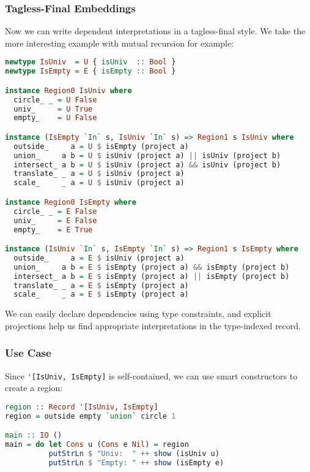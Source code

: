 \hypertarget{tagless-final-embeddings}{%
\subsubsection{Tagless-Final Embeddings}\label{tagless-final-embeddings}}

Now we can write dependent interpretations in a tagless-final style. We
take the more interesting example with mutual recursion for example:

\begin{lstlisting}[language=Haskell]
newtype IsUniv  = U { isUniv  :: Bool }
newtype IsEmpty = E { isEmpty :: Bool }

instance Region0 IsUniv where
  circle_ _ = U False
  univ_     = U True
  empty_    = U False

instance (IsEmpty `In` s, IsUniv `In` s) => Region1 s IsUniv where
  outside_     a = U $ isEmpty (project a)
  union_     a b = U $ isUniv (project a) || isUniv (project b)
  intersect_ a b = U $ isUniv (project a) && isUniv (project b)
  translate_ _ a = U $ isUniv (project a)
  scale_     _ a = U $ isUniv (project a)

instance Region0 IsEmpty where
  circle_ _ = E False
  univ_     = E False
  empty_    = E True

instance (IsUniv `In` s, IsEmpty `In` s) => Region1 s IsEmpty where
  outside_     a = E $ isUniv (project a)
  union_     a b = E $ isEmpty (project a) && isEmpty (project b)
  intersect_ a b = E $ isEmpty (project a) || isEmpty (project b)
  translate_ _ a = E $ isEmpty (project a)
  scale_     _ a = E $ isEmpty (project a)
\end{lstlisting}
\noindent
We can easily declare dependencies using type constraints, and
explicit projections help us find appropriate interpretations
in the type-indexed record.

\hypertarget{use-case}{%
\subsubsection{Use Case}\label{use-case}}

Since \lstinline!'[IsUniv, IsEmpty]! is self-contained,
we can use smart constructors to create a region:

\begin{lstlisting}[language=Haskell,deletekeywords={union,intersect}]
region :: Record '[IsUniv, IsEmpty]
region = outside empty `union` circle 1

main :: IO ()
main = do let Cons u (Cons e Nil) = region
          putStrLn $ "Univ:  " ++ show (isUniv u)
          putStrLn $ "Empty: " ++ show (isEmpty e)
\end{lstlisting}

